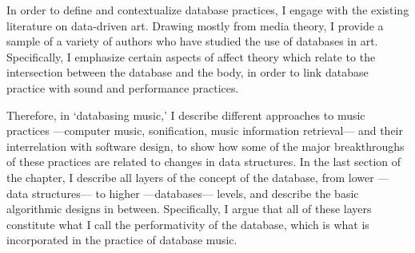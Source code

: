 In order to define and contextualize database practices, I engage with the existing literature on data-driven art. Drawing mostly from media theory, I provide a sample of a variety of authors who have studied the use of databases in art. Specifically, I emphasize certain aspects of affect theory which relate to the intersection between the database and the body, in order to link database practice with sound and performance practices. 

Therefore, in `databasing music,' I describe different approaches to music practices ---computer music, sonification, music information retrieval--- and their interrelation with software design, to show how some of the major breakthroughs of these practices are related to changes in data structures. In the last section of the chapter, I describe all layers of the concept of the database, from lower ---data structures--- to higher ---databases--- levels, and describe the basic algorithmic designs in between. Specifically, I argue that all of these layers constitute what I call the performativity of the database, which is what is incorporated in the practice of database music.